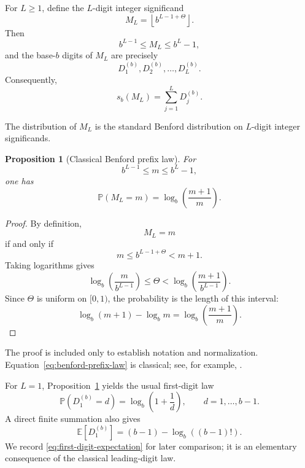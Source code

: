 \documentclass[11pt]{article}
\newtheorem{proposition}[theorem]{Proposition}
\theoremstyle{definition}
\theoremstyle{remark}
\begin{document}
For \(L\ge1\), define the \(L\)-digit integer significand
\begin{equation}
    M_L
    =
    \left\lfloor b^{L-1+\Theta}\right\rfloor.
    \label{eq:ML-definition}
\end{equation}
Then
\[
    b^{L-1}\le M_L\le b^L-1,
\]
and the base-\(b\) digits of \(M_L\) are precisely
\[
    D_1^{(b)},D_2^{(b)},\ldots,D_L^{(b)}.
\]
Consequently,
\begin{equation}
    s_b(M_L)
    =
    \sum_{j=1}^{L}D_j^{(b)}.
    \label{eq:digit-sum-prefix}
\end{equation}

The distribution of \(M_L\) is the standard Benford distribution on
\(L\)-digit integer significands.

\begin{proposition}[Classical Benford prefix law]
\label{prop:benford-prefix-law}
For
\[
    b^{L-1}\le m\le b^L-1,
\]
one has
\begin{equation}
    \mathbb P(M_L=m)
    =
    \log_b\!\left(\frac{m+1}{m}\right).
    \label{eq:benford-prefix-law}
\end{equation}
\end{proposition}

\begin{proof}
By definition,
\[
    M_L=m
\]
if and only if
\[
    m
    \le
    b^{L-1+\Theta}
    <
    m+1.
\]
Taking logarithms gives
\[
    \log_b\!\left(\frac{m}{b^{L-1}}\right)
    \le
    \Theta
    <
    \log_b\!\left(\frac{m+1}{b^{L-1}}\right).
\]
Since \(\Theta\) is uniform on \([0,1)\), the probability is the
length of this interval:
\[
    \log_b(m+1)-\log_b m
    =
    \log_b\!\left(\frac{m+1}{m}\right).
\]
\end{proof}

The proof is included only to establish notation and normalization.
Equation~\eqref{eq:benford-prefix-law} is classical; see, for example,
\cite{Diaconis1977,Hill1995Phenomenon,BergerHill2011,BergerHill2015}.

For \(L=1\), Proposition~\ref{prop:benford-prefix-law} yields the
usual first-digit law
\begin{equation}
    \mathbb P(D_1^{(b)}=d)
    =
    \log_b\!\left(1+\frac1d\right),
    \qquad
    d=1,\ldots,b-1.
    \label{eq:first-digit-law}
\end{equation}
A direct finite summation also gives
\begin{equation}
    \mathbb E[D_1^{(b)}]
    =
    (b-1)-\log_b((b-1)!).
    \label{eq:first-digit-expectation}
\end{equation}
We record \eqref{eq:first-digit-expectation} for later comparison;
it is an elementary consequence of the classical leading-digit law.
\end{document}
